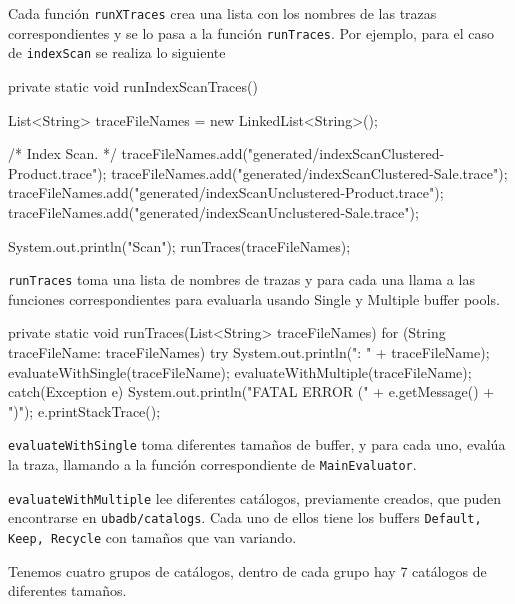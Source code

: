 Cada función \texttt{runXTraces} crea una lista con los nombres de las trazas
correspondientes y se lo pasa a la función \texttt{runTraces}.
Por ejemplo, para el caso de \texttt{indexScan} se realiza lo siguiente

\newpage

\vspace*{-0.2cm}

\begin{verbatimtab}[4]
private static void runIndexScanTraces()
{
	List<String> traceFileNames = new LinkedList<String>();
	
	/* Index Scan. */
	traceFileNames.add("generated/indexScanClustered-Product.trace");
	traceFileNames.add("generated/indexScanClustered-Sale.trace");
	traceFileNames.add("generated/indexScanUnclustered-Product.trace");
	traceFileNames.add("generated/indexScanUnclustered-Sale.trace");
	
	System.out.println("\nIndex Scan\n");		
	runTraces(traceFileNames);
}
\end{verbatimtab}

\texttt{runTraces} toma una lista de nombres de trazas y para cada una llama
a las funciones correspondientes para evaluarla usando Single y Multiple buffer pools.

\begin{verbatimtab}[4]
private static void runTraces(List<String> traceFileNames)
{
	for (String traceFileName: traceFileNames)
	{
		try
		{				
			System.out.println("\nTrace: " + traceFileName);
			evaluateWithSingle(traceFileName);
			evaluateWithMultiple(traceFileName);
		}
		catch(Exception e)
		{
			System.out.println("FATAL ERROR (" + e.getMessage() + ")");
			e.printStackTrace();
		}
	}
}
\end{verbatimtab}

\texttt{evaluateWithSingle} toma diferentes tamaños de buffer, y para
cada uno, evalúa la traza, llamando a la función correspondiente
de \texttt{MainEvaluator}.

\newpage

\texttt{evaluateWithMultiple} lee diferentes catálogos, previamente
creados, que puden encontrarse en \texttt{ubadb/catalogs}. 
Cada uno de ellos tiene los buffers \texttt{Default, Keep, Recycle}
con tamaños que van variando.

\vspace*{0.5cm}

Tenemos cuatro grupos de catálogos, dentro de cada grupo hay 7 
catálogos de diferentes tamaños.

